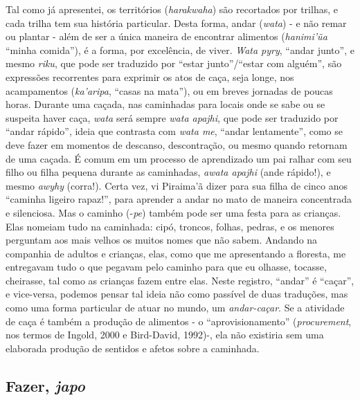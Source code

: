 Tal como já apresentei, os territórios (\emph{harakwaha}) são recortados
por trilhas, e cada trilha tem sua história particular. Desta forma,
andar (\emph{wata}) - e não remar ou plantar - além de ser a única
maneira de encontrar alimentos (\emph{hanimi'ũa} ``minha comida''), é a
forma, por excelência, de viver. \emph{Wata pyry}, ``andar junto'', e
mesmo \emph{riku}, que pode ser traduzido por ``estar junto''/``estar
com alguém'', são expressões recorrentes para exprimir os atos de caça,
seja longe, nos acampamentos (\emph{ka'aripa}, ``casas na mata''), ou em
breves jornadas de poucas horas. Durante uma caçada, nas caminhadas para
locais onde se sabe ou se suspeita haver caça, \emph{wata} será sempre
\emph{wata apajhi}, que pode ser traduzido por ``andar rápido'', ideia
que contrasta com \emph{wata me}, ``andar lentamente'', como se deve
fazer em momentos de descanso, descontração, ou mesmo quando retornam de
uma caçada. É comum em um processo de aprendizado um pai ralhar com seu
filho ou filha pequena durante as caminhadas, \emph{awata apajhi} (ande
rápido!), e mesmo \emph{awyhy} (corra!). Certa vez, vi Piraima'ã dizer
para sua filha de cinco anos ``caminha ligeiro rapaz!'', para aprender a
andar no mato de maneira concentrada e silenciosa. Mas o caminho
(-\emph{pe}) também pode ser uma festa para as crianças. Elas nomeiam
tudo na caminhada: cipó, troncos, folhas, pedras, e os menores perguntam
aos mais velhos os muitos nomes que não sabem. Andando na companhia de
adultos e crianças, elas, como que me apresentando a floresta, me
entregavam tudo o que pegavam pelo caminho para que eu olhasse, tocasse,
cheirasse, tal como as crianças fazem entre elas. Neste registro,
``andar'' é ``caçar'', e vice-versa, podemos pensar tal ideia não como
passível de duas traduções, mas como uma forma particular de atuar no
mundo, um \emph{andar-caçar}. Se a atividade de caça é também a produção
de alimentos - o ``aprovisionamento'' (\emph{procurement}, nos termos de
Ingold, 2000 e Bird-David, 1992)-, ela não existiria sem uma elaborada
produção de sentidos e afetos sobre a caminhada.

\hypertarget{section-1}{%
\subsection{}\label{section-1}}

\hypertarget{fazer-japo}{%
\subsection{\texorpdfstring{Fazer,
\emph{japo}}{Fazer, japo}}\label{fazer-japo}}

